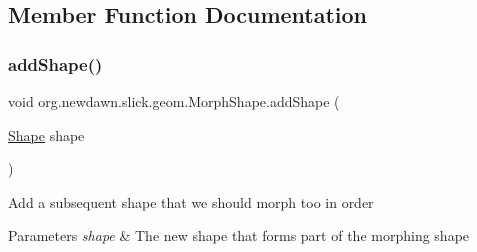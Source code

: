 \subsection{Member Function Documentation}
\mbox{\label{classorg_1_1newdawn_1_1slick_1_1geom_1_1_morph_shape_a3f052286d029f6277988a385cc633a68}} 
\subsubsection{\texorpdfstring{add\+Shape()}{addShape()}}
{\footnotesize\ttfamily void org.\+newdawn.\+slick.\+geom.\+Morph\+Shape.\+add\+Shape (\begin{DoxyParamCaption}\item[{\mbox{\hyperlink{classorg_1_1newdawn_1_1slick_1_1geom_1_1_shape}{Shape}}}]{shape }\end{DoxyParamCaption})\hspace{0.3cm}{\ttfamily [inline]}}

Add a subsequent shape that we should morph too in order


\begin{DoxyParams}{Parameters}
{\em shape} & The new shape that forms part of the morphing shape \\
\hline
\end{DoxyParams}

